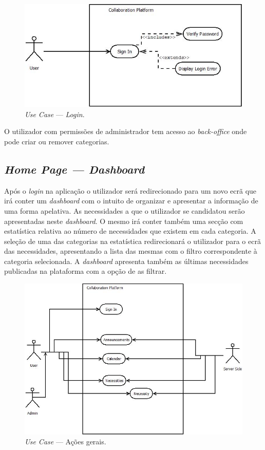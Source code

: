 \begin{figure}[H]
    \centering
    \includegraphics[scale=0.6]{figures/Login Use Case.jpeg}
    \caption{\textit{Use Case} --- \textit{Login}.}\label{fig:uc:login}
\end{figure}

O utilizador com permissões de administrador tem acesso ao \textit{back-office} onde pode criar ou remover categorias.

\subsection{\textit{Home Page --- Dashboard}}\label{subsec:dashboard}

Após o \textit{login} na aplicação o utilizador será redirecionado para um novo ecrã que irá conter um \textit{dashboard} com o intuito de organizar e 
apresentar a informação de uma forma apelativa. As necessidades a que o utilizador se candidatou serão apresentadas neste \textit{dashboard}. 
O mesmo irá conter também uma secção com estatística relativa ao número de necessidades que existem em cada categoria. 
A seleção de uma das categorias na estatística redirecionará o utilizador para o ecrã das necessidades, 
apresentando a lista das mesmas com o filtro correspondente à categoria selecionada. 
A \textit{dashboard} apresenta também as últimas necessidades publicadas na plataforma com a opção de as filtrar.

\begin{figure}[H]
    \centering
    \includegraphics[scale=0.6]{figures/General Actions.jpeg}
    \caption{\textit{Use Case} --- Ações gerais.}\label{fig:uc:generalactions}
\end{figure}

